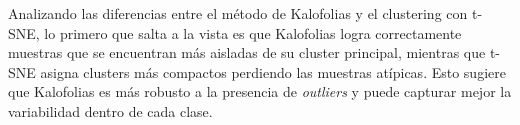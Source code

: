 \documentclass{article}
\begin{document}
Analizando las diferencias entre el método de Kalofolias y el clustering con t-SNE, lo primero que salta a la vista es que Kalofolias logra correctamente muestras que se encuentran más aisladas de su cluster principal, mientras que t-SNE asigna clusters más compactos perdiendo las muestras atípicas. Esto sugiere que Kalofolias es más robusto a la presencia de \textit{outliers} y puede capturar mejor la variabilidad dentro de cada clase. 





\end{document}
